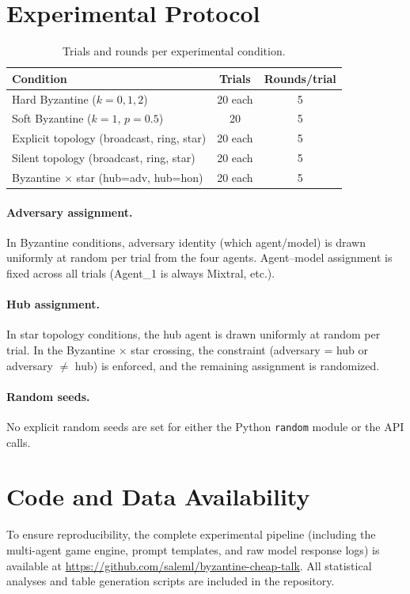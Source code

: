 \documentclass[runningheads]{llncs}
\begin{document}
\section{Experimental Protocol}\label{app:protocol}

\begin{table}[h]
\centering
\caption{Trials and rounds per experimental condition.}\label{tab:protocol}
\smallskip
\begin{tabular}{@{}lcc@{}}
\toprule
Condition & Trials & Rounds/trial \\
\midrule
Hard Byzantine ($k{=}0, 1, 2$) & 20 each & 5 \\
Soft Byzantine ($k{=}1$, $p{=}0.5$) & 20 & 5 \\
Explicit topology (broadcast, ring, star) & 20 each & 5 \\
Silent topology (broadcast, ring, star) & 20 each & 5 \\
Byzantine $\times$ star (hub=adv, hub=hon) & 20 each & 5 \\
\bottomrule
\end{tabular}
\end{table}

\paragraph{Adversary assignment.}
In Byzantine conditions, adversary identity (which agent/model) is drawn uniformly at random per trial from the four agents.
Agent--model assignment is fixed across all trials (Agent\_1 is always Mixtral, etc.).

\paragraph{Hub assignment.}
In star topology conditions, the hub agent is drawn uniformly at random per trial.
In the Byzantine $\times$ star crossing, the constraint (adversary = hub or adversary $\neq$ hub) is enforced, and the remaining assignment is randomized.

\paragraph{Random seeds.}
No explicit random seeds are set for either the Python \texttt{random} module or the API calls.

\section{Code and Data Availability}\label{app:code}
To ensure reproducibility, the complete experimental pipeline (including the multi-agent game engine, prompt templates, and raw model response logs) is available at \url{https://github.com/saleml/byzantine-cheap-talk}. All statistical analyses and table generation scripts are included in the repository.
\end{document}
